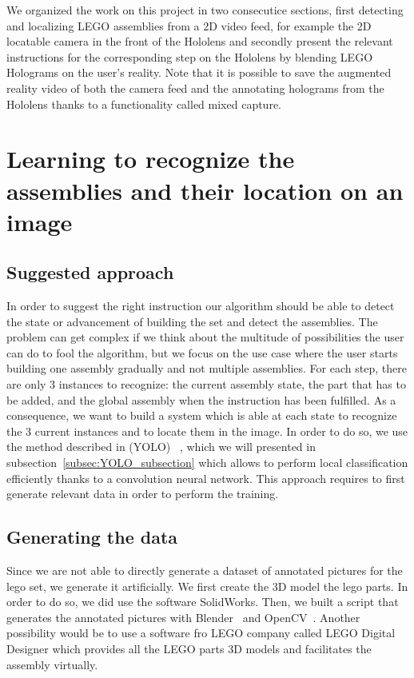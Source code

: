 \documentclass[10pt,twocolumn,letterpaper]{article}
\begin{document}
We organized the work on this project in two consecutice sections, first detecting and localizing LEGO assemblies from a 2D video feed, for example the 2D locatable camera in the front of the Hololens and secondly present the relevant instructions for the corresponding step on the Hololens by blending LEGO Holograms on the user's reality. Note that it is possible to save the augmented reality video of both the camera feed and the annotating holograms from the Hololens thanks to a functionality called mixed capture. 

\section{Learning to recognize the assemblies and their location on an image}

\subsection{Suggested approach}

In order to suggest the right instruction our algorithm should be able to detect the state or advancement of building the set and detect the assemblies. The problem can get complex if we think about the multitude of possibilities the user can do to fool the algorithm, but we focus on the use case where the user starts building one assembly gradually and not multiple assemblies. For each step, there are only 3 instances to recognize: the current assembly state, the part that has to be added, and the global assembly when the instruction has been fulfilled. As a consequence, we want to build a system which is able at each state to recognize the 3 current instances and to locate them in the image.
\medbreak
In order to do so, we use the method described in (YOLO) ~\cite{redmon_you_2015}, which we will presented in subsection~\ref{subsec:YOLO_subsection} which allows to perform local classification efficiently thanks to a convolution neural network. This approach requires to first generate relevant data in order to perform the training.

\subsection{Generating the data}

Since we are not able to directly generate a dataset of annotated pictures for the lego set, we generate it artificially. We first create the 3D model the lego parts. In order to do so, we did use the software SolidWorks. Then, we built a script that generates the annotated pictures with Blender~\cite{blender} and OpenCV~\cite{opencv_library}. Another possibility would be to use a software fro LEGO company called LEGO Digital Designer which provides all the LEGO parts 3D models and facilitates the assembly virtually.
\end{document}

